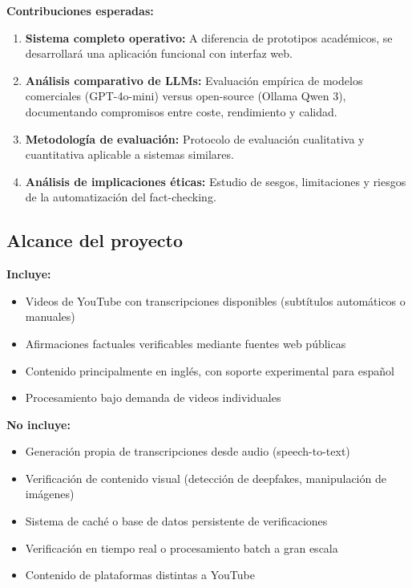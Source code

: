 \documentclass[12pt,a4paper]{article}
\begin{document}
\textbf{Contribuciones esperadas:}

\begin{enumerate}
    \item \textbf{Sistema completo operativo:} A diferencia de prototipos académicos, se desarrollará una aplicación funcional con interfaz web.

    \item \textbf{Análisis comparativo de LLMs:} Evaluación empírica de modelos comerciales (GPT-4o-mini) versus open-source (Ollama Qwen 3), documentando compromisos entre coste, rendimiento y calidad.

    \item \textbf{Metodología de evaluación:} Protocolo de evaluación cualitativa y cuantitativa aplicable a sistemas similares.

    \item \textbf{Análisis de implicaciones éticas:} Estudio de sesgos, limitaciones y riesgos de la automatización del fact-checking.
\end{enumerate}

\subsection{Alcance del proyecto}

\textbf{Incluye:}
\begin{itemize}
    \item Videos de YouTube con transcripciones disponibles (subtítulos automáticos o manuales)
    \item Afirmaciones factuales verificables mediante fuentes web públicas
    \item Contenido principalmente en inglés, con soporte experimental para español
    \item Procesamiento bajo demanda de videos individuales
\end{itemize}

\textbf{No incluye:}
\begin{itemize}
    \item Generación propia de transcripciones desde audio (speech-to-text)
    \item Verificación de contenido visual (detección de deepfakes, manipulación de imágenes)
    \item Sistema de caché o base de datos persistente de verificaciones
    \item Verificación en tiempo real o procesamiento batch a gran escala
    \item Contenido de plataformas distintas a YouTube
\end{itemize}
\end{document}
